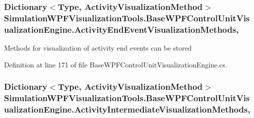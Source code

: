 \subsubsection[{\texorpdfstring{Activity\+End\+Event\+Visualization\+Methods}{ActivityEndEventVisualizationMethods}}]{\setlength{\rightskip}{0pt plus 5cm}Dictionary$<$Type, {\bf Activity\+Visualization\+Method}$>$ Simulation\+W\+P\+F\+Visualization\+Tools.\+Base\+W\+P\+F\+Control\+Unit\+Visualization\+Engine.\+Activity\+End\+Event\+Visualization\+Methods\hspace{0.3cm}{\ttfamily [get]}, {\ttfamily [protected]}}\hypertarget{class_simulation_w_p_f_visualization_tools_1_1_base_w_p_f_control_unit_visualization_engine_a9b7d65805c8283c661e2a2676ef5bf83}{}\label{class_simulation_w_p_f_visualization_tools_1_1_base_w_p_f_control_unit_visualization_engine_a9b7d65805c8283c661e2a2676ef5bf83}


Methods for visualization of activity end events can be stored 



Definition at line 171 of file Base\+W\+P\+F\+Control\+Unit\+Visualization\+Engine.\+cs.

\subsubsection[{\texorpdfstring{Activity\+Intermediate\+Visualization\+Methods}{ActivityIntermediateVisualizationMethods}}]{\setlength{\rightskip}{0pt plus 5cm}Dictionary$<$Type, {\bf Activity\+Visualization\+Method}$>$ Simulation\+W\+P\+F\+Visualization\+Tools.\+Base\+W\+P\+F\+Control\+Unit\+Visualization\+Engine.\+Activity\+Intermediate\+Visualization\+Methods\hspace{0.3cm}{\ttfamily [get]}, {\ttfamily [protected]}}\hypertarget{class_simulation_w_p_f_visualization_tools_1_1_base_w_p_f_control_unit_visualization_engine_ab1e8a2f15a0b29f57e5b7d1ec4881bcc}{}\label{class_simulation_w_p_f_visualization_tools_1_1_base_w_p_f_control_unit_visualization_engine_ab1e8a2f15a0b29f57e5b7d1ec4881bcc}


